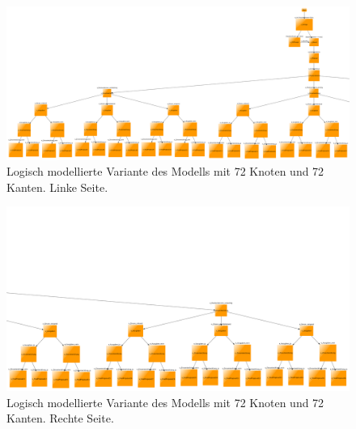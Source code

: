 \begin{figure}[p] \begin{leftfullpage}
\hspace*{-2.5cm}
\includegraphics[width=1.2\textwidth]{figures/modell_komplex_left.png}
\caption{Logisch modellierte Variante des Modells mit 72 Knoten und 72 Kanten. Linke Seite.}
\label{fig:modell_komplex}
\end{leftfullpage} 
\end{figure} 
\begin{figure}[p] 
\begin{fullpage} 
\hspace*{-2.5cm}
\includegraphics[width=1.2\textwidth]{figures/modell_komplex_right.png}
\caption{Logisch modellierte Variante des Modells mit 72 Knoten und 72 Kanten. Rechte Seite.}
\end{fullpage} \end{figure} 

